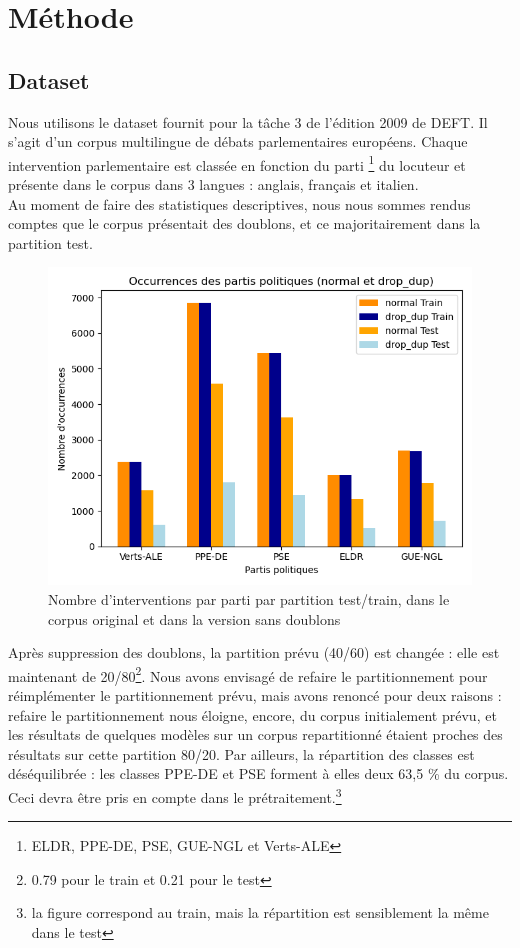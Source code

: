 \section{Méthode}

\subsection{Dataset}

Nous utilisons le dataset fournit pour la tâche 3 de l’édition 2009 de DEFT.
Il s'agit d'un corpus multilingue de débats parlementaires européens. Chaque intervention
parlementaire est classée en fonction du parti \footnote {ELDR, PPE-DE, PSE, GUE-NGL et Verts-ALE}
du locuteur et présente dans le corpus dans 3 langues : anglais, français et italien.\\
Au moment de faire des statistiques descriptives, nous nous sommes rendus comptes 
que le corpus présentait des doublons, et ce majoritairement dans la partition test.
\begin{figure}[ht]
    \centering
    \includegraphics[width=\columnwidth]{../stats/occurences_orig_vs_drop_dup_par_cat.png}
    \caption{Nombre d'interventions par parti par partition test/train, dans le corpus original et dans la version sans doublons}
    \label{fig:barplot_dataset}
\end{figure}

Après suppression des doublons, la partition prévu (40/60) est changée : elle est 
maintenant de 20/80\footnote{ 0.79 pour le train et 0.21 pour le test}.
Nous avons envisagé de refaire le partitionnement pour réimplémenter le partitionnement 
prévu, mais avons renoncé pour deux raisons : 
refaire le partitionnement nous éloigne, encore, du corpus initialement prévu, et les 
résultats de quelques modèles sur un corpus repartitionné étaient proches des résultats 
sur cette partition 80/20.
Par ailleurs, la répartition des classes est déséquilibrée : les classes PPE-DE et PSE forment à elles deux 63,5 \% du corpus. Ceci devra être 
pris en compte dans le prétraitement.\footnote{la figure correspond au train, mais la répartition est sensiblement la même dans le test}

